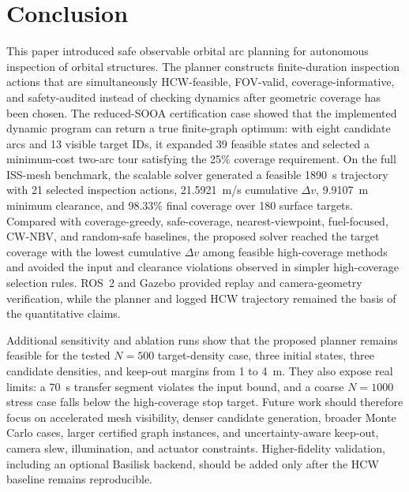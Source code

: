 \section{Conclusion}
\label{sec:conclusion}

This paper introduced safe observable orbital arc planning for autonomous
inspection of orbital structures. The planner constructs finite-duration
inspection actions that are simultaneously HCW-feasible, FOV-valid,
coverage-informative, and safety-audited instead of checking dynamics after
geometric coverage has been chosen. The reduced-SOOA certification case showed
that the implemented dynamic program can return a true finite-graph optimum:
with eight candidate arcs and 13 visible target IDs, it expanded 39 feasible
states and selected a minimum-cost two-arc tour satisfying the 25\% coverage
requirement. On the
full ISS-mesh benchmark, the scalable solver generated a feasible 1890~s
trajectory with 21 selected inspection actions, 21.5921~m/s cumulative $\Delta v$,
9.9107~m minimum clearance, and 98.33\% final coverage over 180 surface
targets. Compared with coverage-greedy, safe-coverage, nearest-viewpoint,
fuel-focused, CW-NBV, and random-safe baselines, the proposed solver reached
the target coverage with the lowest cumulative $\Delta v$ among feasible
high-coverage methods and avoided the input and clearance violations observed
in simpler high-coverage selection rules. ROS~2 and Gazebo provided replay and
camera-geometry verification, while the planner and logged HCW trajectory
remained the basis of the quantitative claims.

Additional sensitivity and ablation runs show that the proposed planner
remains feasible for the tested $N=500$ target-density case, three initial
states, three candidate densities, and keep-out margins from 1 to 4~m. They
also expose real limits: a 70~s transfer segment violates the input bound, and
a coarse $N=1000$ stress case falls below the high-coverage stop target.
Future work should therefore focus on accelerated mesh visibility, denser
candidate generation, broader Monte Carlo cases, larger certified graph
instances, and uncertainty-aware keep-out, camera slew, illumination, and
actuator constraints. Higher-fidelity validation, including an optional
Basilisk backend, should be added only after the HCW baseline remains
reproducible.
